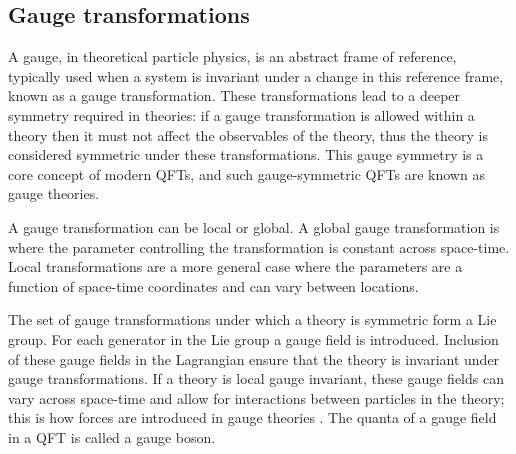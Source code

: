 \subsection{Gauge transformations}

A gauge, in theoretical particle physics, is an abstract frame of reference,
typically used when a system is invariant under a change in this reference
frame, known as a gauge transformation. These transformations lead to a deeper
symmetry required in theories: if a gauge transformation is allowed within a
theory then it must not affect the observables of the theory, thus the theory is
considered symmetric under these transformations.  This gauge symmetry is a core
concept of modern \acp{QFT}, and such gauge-symmetric \acp{QFT} are known as
gauge theories.

A gauge transformation can be local or global. A global gauge transformation is
where the parameter controlling the transformation is constant across
space-time. Local transformations are a more general case where the parameters
are a function of space-time coordinates and can vary between locations.

The set of gauge transformations under which a theory is symmetric form a Lie
group. For each generator in the Lie group a gauge field is introduced.
Inclusion of these gauge fields in the Lagrangian ensure that the theory is
invariant under gauge transformations. If a theory is local gauge invariant,
these gauge fields can vary across space-time and allow for interactions between
particles in the theory; this is how forces are introduced in gauge theories
\cite[pp.242-3]{Thomson2013}.  The quanta of a gauge field in a \ac{QFT} is
called a gauge boson.
